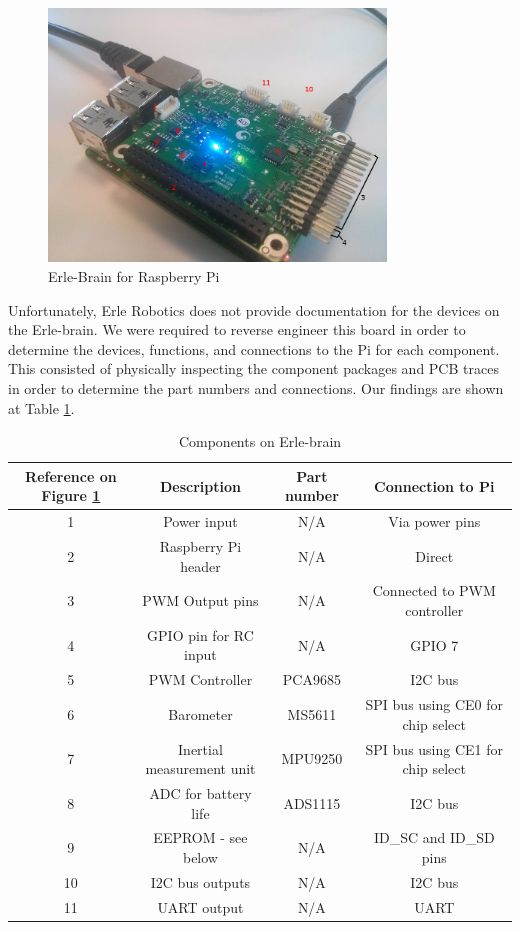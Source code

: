 \documentclass[capstone_report.tex]{subfiles}
\begin{document}
    \begin{figure}[H]
        \centering
        \includegraphics[width=0.8\textwidth]{imgs/erleHat.jpg}
        \caption{Erle-Brain for Raspberry Pi\label{fig:erleHat}}
    \end{figure}


    Unfortunately, Erle Robotics does not provide documentation for the devices on the Erle-brain. We were required to reverse engineer this board in order to determine the devices, functions, and connections to the Pi for each component. This consisted of physically inspecting the component packages and PCB traces in order to determine the part numbers and connections. Our findings are shown at Table \ref{tab:ebcomponents}.

    \begin{table}[H]
    \centering
        \begin{tabular}{|c|c|c|c|}
            \hline
            Reference on Figure \ref{fig:erleHat} & Description & Part number & Connection to Pi\\
            \hline
            1 & Power input & N/A & Via power pins \\
            2 & Raspberry Pi header & N/A & Direct \\
            3 & PWM Output pins & N/A & Connected to PWM controller \\
            4 & GPIO pin for RC input & N/A & GPIO 7 \\
            5 & PWM Controller & PCA9685 & I2C bus \\
            6 & Barometer & MS5611 & SPI bus using CE0 for chip select\\
            7 & Inertial measurement unit & MPU9250 & SPI bus using CE1 for chip select\\
            8 & ADC for battery life & ADS1115 & I2C bus \\
            9 & EEPROM - see below & N/A & ID\_SC and ID\_SD pins\\
            10 & I2C bus outputs & N/A & I2C bus \\
            11 & UART output & N/A & UART \\
            \hline
        \end{tabular}
    \caption{Components on Erle-brain\label{tab:ebcomponents}}
    \end{table}
\end{document}
